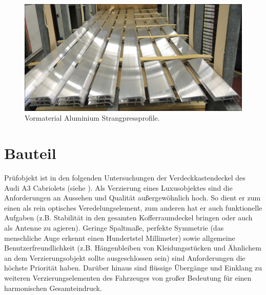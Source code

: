 \documentclass[12pt,a4paper,parskip,twoside,BCOR5mm,headsepline]{scrartcl}
\begin{document}
\begin{figure}[H]
 \centering
 \includegraphics[width=.8\textwidth]{vormaterial}
 \caption{Vormaterial Aluminium Strangpressprofile.}
 \label{fig:vormaterial}
 \end{figure}
  







  
\newpage
\section{Bauteil}
Prüfobjekt ist in den folgenden Untersuchungen der Verdeckkastendeckel  des Audi A3 Cabriolets (siehe ).
 Als Verzierung eines Luxusobjektes sind die Anforderungen an Aussehen und Qualität außergewöhnlich hoch. So dient er zum einen als rein optisches Veredelungselement, zum anderen hat er auch funktionelle Aufgaben (z.B. Stabilität in den gesamten Kofferraumdeckel bringen oder auch als Antenne zu agieren). Geringe Spaltmaße,  perfekte Symmetrie (das menschliche Auge erkennt einen Hundertstel Millimeter) sowie allgemeine Benutzerfreundlichkeit (z.B. Hängenbleiben von Kleidungsstücken und Ähnlichem an dem Verzierungsobjekt sollte ausgeschlossen sein) sind Anforderungen die höchste Priorität haben.
 Darüber hinaus sind  flüssige Übergänge und Einklang   zu weiteren Verzierungselementen des Fahrzeuges von großer Bedeutung für einen harmonischen Gesamteindruck.
 
\end{document}
